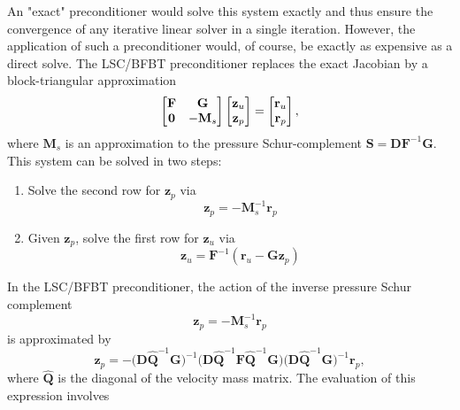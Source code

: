 An "exact" preconditioner would solve this system exactly and thus
ensure the convergence of any iterative linear solver in a single 
iteration. However, the application of such a preconditioner
would, of course, be exactly as expensive as a direct solve.
The LSC/BFBT preconditioner replaces the exact Jacobian by 
a block-triangular approximation
\begin{equation*}
\begin{bmatrix}
{\bf F} & {\bf G} \\ {\bf 0} & -{\bf M}_s 
\end{bmatrix} 
\begin{bmatrix}
{\bf z}_u \\ {\bf z}_p
\end{bmatrix} 
=
\begin{bmatrix}
{\bf r}_u \\ {\bf r}_p
\end{bmatrix}
,
\end{equation*}
where $\mathbf{M}_s$ is an approximation to the pressure 
Schur-complement $\mathbf{S}=\mathbf{D} \mathbf{F}^{-1}\mathbf{G}$.
This system can be solved in two steps:
\begin{enumerate}
\item Solve the second row for $\mathbf{z}_p$ via
   \begin{equation*}
   \mathbf{z}_p = - \mathbf{M}_s^{-1} \mathbf{r}_p
   \end{equation*}
\item Given $\mathbf{ z}_p$, solve the first row for $\mathbf{z}_u$ via
   \begin{equation*}
   \mathbf{z}_u = \mathbf{F}^{-1} \left( \mathbf{r}_u - \mathbf{G} \mathbf{z}_p \right)
   \end{equation*}
\end{enumerate}
In the LSC/BFBT preconditioner, the action of the inverse pressure
Schur complement 
\begin{equation*}
\mathbf{z}_p = - \mathbf{M}_s^{-1} \mathbf{r}_p
\end{equation*}
is approximated by
\begin{equation*}
\mathbf{z}_p = - 
\big(\mathbf{D} \widehat{\mathbf Q}^{-1}{\mathbf G} \big)^{-1}
\big({\mathbf D} \widehat{\mathbf Q}^{-1}{\mathbf F} \widehat{\mathbf Q}^{-1}{\mathbf G}\big) 
\big({\mathbf D} \widehat{\mathbf Q}^{-1}{\mathbf G} \big)^{-1}
{\mathbf r}_p,
\end{equation*}
where  $ \widehat{\mathbf Q}$ is the diagonal of the velocity
mass matrix. The evaluation of this expression involves
